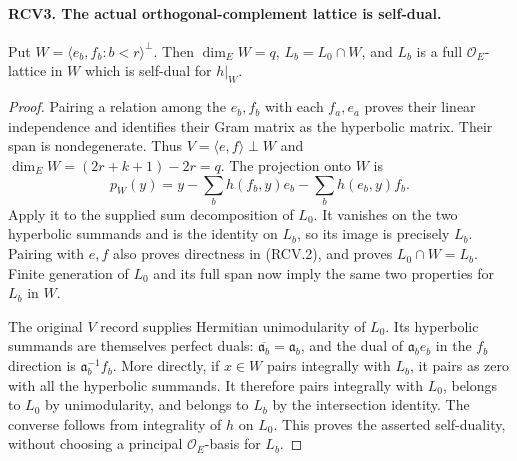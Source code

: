 \paragraph{RCV3. The actual orthogonal-complement lattice is self-dual.}
\label{claim:RCV3}
Put \(W=\langle e_b,f_b:b<r\rangle^\perp\).  Then
\(\dim_E W=q\), \(L_b=L_0\cap W\), and \(L_b\) is a full
\(\mathcal O_E\)-lattice in \(W\) which is self-dual for \(h|_W\).
\begin{proof}
Pairing a relation among the \(e_b,f_b\) with each \(f_a,e_a\)
proves their linear independence and identifies their Gram matrix
as the hyperbolic matrix.  Their span is nondegenerate.  Thus
\(V=\langle e,f\rangle\perp W\) and
\(\dim_E W=(2r+k+1)-2r=q\).  The projection onto \(W\) is
\[
 p_W(y)=y-\sum_b h(f_b,y)e_b-\sum_b h(e_b,y)f_b.
\tag{RCV.5}
\]
Apply it to the supplied sum decomposition of \(L_0\).  It vanishes
on the two hyperbolic summands and is the identity on \(L_b\),
so its image is precisely \(L_b\).  Pairing with \(e,f\) also
proves directness in (RCV.2), and proves \(L_0\cap W=L_b\).
Finite generation of \(L_0\) and its full span now imply the
same two properties for \(L_b\) in \(W\).

The original \(V\) record supplies Hermitian unimodularity of
\(L_0\).  Its hyperbolic summands are themselves perfect duals:
\(\overline{\mathfrak a_b}=\mathfrak a_b\), and the dual of
\(\mathfrak a_b e_b\) in the \(f_b\) direction is
\(\mathfrak a_b^{-1}f_b\).  More directly, if \(x\in W\)
pairs integrally with \(L_b\), it pairs as zero with all the
hyperbolic summands.  It therefore pairs integrally with \(L_0\),
belongs to \(L_0\) by unimodularity, and belongs to \(L_b\) by
the intersection identity.  The converse follows from integrality
of \(h\) on \(L_0\).  This proves the asserted self-duality,
without choosing a principal \(\mathcal O_E\)-basis for \(L_b\).
\end{proof}

